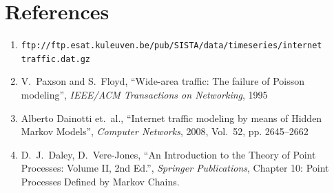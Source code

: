 \documentclass[11pt, twoside]{article}
\begin{document}
\section*{References}

\begin{enumerate}[label=(\arabic*)]
	\item \texttt{ftp://ftp.esat.kuleuven.be/pub/SISTA/data/timeseries/internet traffic.dat.gz}
	\item V.\ Paxson and S.\ Floyd, ``Wide-area traffic: The failure of Poisson modeling'', \emph{IEEE/ACM Transactions on Networking}, 1995
	\item Alberto Dainotti et.\ al., ``Internet traffic modeling by means of Hidden Markov Models'', \emph{Computer Networks}, 2008, Vol.\ 52, pp. 2645--2662
	\item D.\ J.\ Daley, D.\ Vere-Jones, ``An Introduction to the Theory of Point Processes: Volume II, 2nd Ed.'', \emph{Springer Publications}, Chapter 10: Point Processes Defined by Markov Chains.
\end{enumerate}
\end{document}
